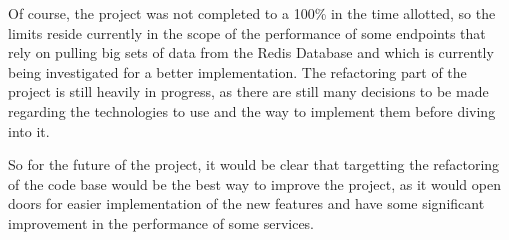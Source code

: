 Of course, the project was not completed to a 100\% in the time allotted, so the
limits reside currently in the scope of the performance of some endpoints 
that rely on pulling big sets of data from the Redis Database and which is currently
being investigated for a better implementation. The refactoring part of the project
is still heavily in progress, as there are still many decisions to be made regarding
the technologies to use and the way to implement them before diving into it.

So for the future of the project, it would be clear that targetting the refactoring
of the code base would be the best way to improve the project, as it would open 
doors for easier implementation of the new features and have some significant improvement
in the performance of some services.
